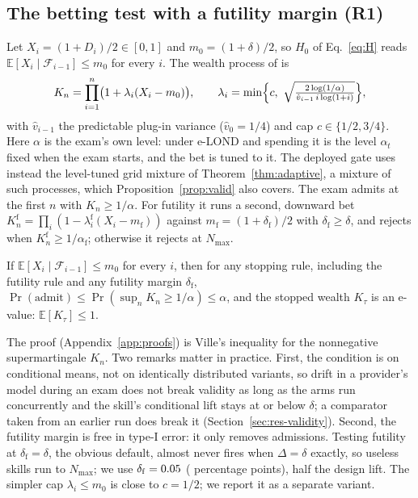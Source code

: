 \subsection{The betting test with a futility margin (R1)}
Let $X_i=(1+D_i)/2\in[0,1]$ and $m_0=(1+\delta)/2$, so $H_0$ of Eq.~\eqref{eq:H} reads $\mathbb{E}[X_i\mid\mathcal F_{i-1}]\le m_0$ for every $i$. The wealth process of \citet{waudbysmith2024betting} is
\begin{equation}
K_n=\prod_{i=1}^n\bigl(1+\lambda_i(X_i-m_0)\bigr),\qquad
\lambda_i=\min\Bigl\{c,\ \sqrt{\tfrac{2\log(1/\alpha)}{\hat v_{i-1}\, i\log(1+i)}}\Bigr\},
\label{eq:wealth}
\end{equation}
with $\hat v_{i-1}$ the predictable plug-in variance ($\hat v_0=1/4$) and cap $c\in\{1/2,3/4\}$. Here $\alpha$ is the exam's own level: under e-LOND and spending it is the level $\alpha_t$ fixed when the exam starts, and the bet is tuned to it. The deployed gate uses instead the level-tuned grid mixture of Theorem~\ref{thm:adaptive}, a mixture of such processes, which Proposition~\ref{prop:valid} also covers. The exam admits at the first $n$ with $K_n\ge1/\alpha$. For futility it runs a second, downward bet $K^{\mathrm f}_n=\prod_i(1-\lambda^{\mathrm f}_i(X_i-m_{\mathrm f}))$ against $m_{\mathrm f}=(1+\delta_{\mathrm f})/2$ with $\delta_{\mathrm f}\ge\delta$, and rejects when $K^{\mathrm f}_n\ge1/\alpha_{\mathrm f}$; otherwise it rejects at $N_{\max}$.

\begin{proposition}[Validity]\label{prop:valid}
If $\mathbb{E}[X_i\mid\mathcal F_{i-1}]\le m_0$ for every $i$, then for any stopping rule, including the futility rule and any futility margin $\delta_{\mathrm f}$, $\Pr(\text{admit})\le\Pr(\sup_n K_n\ge1/\alpha)\le\alpha$, and the stopped wealth $K_\tau$ is an e-value: $\mathbb{E}[K_\tau]\le1$.
\end{proposition}
The proof (Appendix~\ref{app:proofs}) is Ville's inequality for the nonnegative supermartingale $K_n$. Two remarks matter in practice. First, the condition is on conditional means, not on identically distributed variants, so drift in a provider's model during an exam does not break validity as long as the arms run concurrently and the skill's conditional lift stays at or below $\delta$; a comparator taken from an earlier run does break it (Section~\ref{sec:res-validity}). Second, the futility margin is free in type-I error: it only removes admissions. Testing futility at $\delta_{\mathrm f}=\delta$, the obvious default, almost never fires when $\Delta=\delta$ exactly, so useless skills run to $N_{\max}$; we use $\delta_{\mathrm f}=0.05$ (\PFutM{} percentage points), half the design lift. The simpler cap $\lambda_i\le m_0$ is close to $c=1/2$; we report it as a separate variant.


